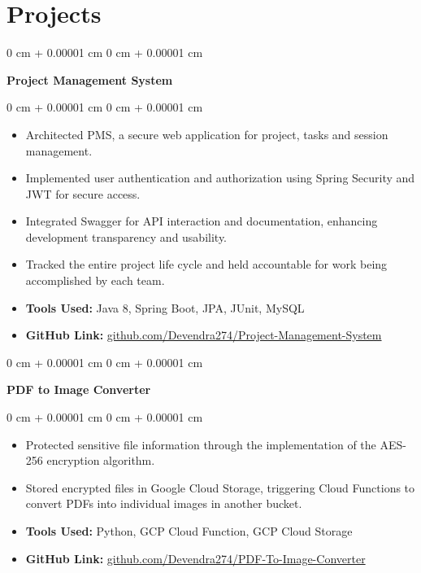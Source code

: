 \documentclass[10pt, letterpaper]{article}
\newenvironment{highlights}{
    \begin{itemize}[
        topsep=0.10 cm,
        parsep=0.10 cm,
        partopsep=0pt,
        itemsep=0pt,
        leftmargin=0 cm + 10pt
    ]
}{
    \end{itemize}
} %
\newenvironment{onecolentry}{
    \begin{adjustwidth}{
        0 cm + 0.00001 cm
    }{
        0 cm + 0.00001 cm
    }
}{
    \end{adjustwidth}
} %
\begin{document}
        \vspace{0.2 cm}
        

    \section{Projects}

        \begin{onecolentry}
            \textbf{Project Management System}
        \end{onecolentry}

        \vspace{0.10 cm}
        \begin{onecolentry}
            \begin{highlights}
                \item Architected PMS, a secure web application for project, tasks and session management.
                \item Implemented user authentication and authorization using Spring Security and JWT for secure access.
                \item Integrated Swagger for API interaction and documentation, enhancing development transparency and usability.
                \item Tracked the entire project life cycle and held accountable for work being accomplished by each team.
                \item \textbf{Tools Used:} Java 8, Spring Boot, JPA, JUnit, MySQL
                \item \textbf{GitHub Link:} \href{https://github.com/Devendra274/Project_Management_System}{github.com/Devendra274/Project-Management-System}
            \end{highlights}
        \end{onecolentry}


        \vspace{0.3 cm}

        \begin{onecolentry}
            \textbf{PDF to Image Converter}
        \end{onecolentry}

        \vspace{0.10 cm}
        \begin{onecolentry}
            \begin{highlights}
                \item Protected sensitive file information through the implementation of the AES-256 encryption algorithm.
                \item Stored encrypted files in Google Cloud Storage, triggering Cloud Functions to convert PDFs into individual images in another bucket.
                \item \textbf{Tools Used:} Python, GCP Cloud Function, GCP Cloud Storage
                \item \textbf{GitHub Link:} \href{https://github.com/Devendra274/PDF_To_Image_Converter}{github.com/Devendra274/PDF-To-Image-Converter}
            \end{highlights}
        \end{onecolentry}
\end{document}
